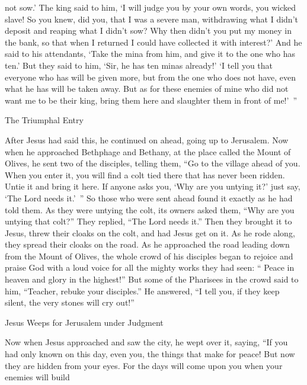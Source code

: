 {not
sow.’
The king said
to him,
‘I will judge
you
by
your own
words,
you wicked
slave! So you knew,
did you, that
I
was
a severe
man,
withdrawing
what
I
didn’t
deposit
and
reaping
what
I
didn’t
sow?
Why
then didn’t
you put
my
money
in
the bank,
so that when I
returned
I could have collected
it
with
interest?’
And
he said
to his attendants, ‘Take
the mina
from
him,
and
give
it to the one who has
ten.’
But
they said
to him,
‘Sir,
he has
ten
minas already!’
‘I tell
you
that
everyone
who has
will be given
more, but
from
the one who does
not
have,
even
what
he has
will be taken away.
But
as for these
enemies
of mine
who did
not
want
me
to be
their king,
bring
them
here
and
slaughter
them
in front of
me!’ ”
\par }{\SH The Triumphal Entry
\par }{\PP {}After
Jesus had said
this,
he continued on
ahead,
going up
to
Jerusalem.
Now when
he approached
Bethphage
and
Bethany,
at
the place called
the Mount
of Olives,
he sent
two
of the disciples,
telling
them, “Go
to
the village
ahead
of you. When
you enter
it, you will find
a colt
tied
there that
has
never
been ridden.
Untie
it
and bring it here.
If
anyone
asks
you,
‘Why
are you untying
it?’ just
say,
‘The Lord
needs
it.’ ”
So
those who were sent ahead
found
it exactly as
he had told
them.
As
they
were untying
the colt,
its
owners
asked
them, “Why
are you untying
that colt?”
They
replied,
“The Lord
needs
it.”
Then
they brought
it
to
Jesus,
threw
their
cloaks
on
the colt,
and had
Jesus
get on it.
As
he
rode along,
they spread
their
cloaks
on
the road.
As
he
approached
the road leading down
from the Mount
of Olives,
the whole
crowd
of his disciples
began
to rejoice
and praise
God
with a
loud
voice
for
all
the mighty works
they had seen:
“{}
Peace
in
heaven
and
glory
in
the highest!”
But
some
of the Pharisees
in
the crowd
said
to
him,
“Teacher,
rebuke
your
disciples.”
He
answered, “I tell
you,
if
they
keep silent,
the very stones
will cry out!”
\par }{\SH Jesus Weeps for Jerusalem under Judgment
\par }{\PP {}Now
when
Jesus approached
and saw
the city,
he wept
over
it,
saying,
“If
you had only known
on
this
day,
even
you,
the things that make for
peace!
 But
now
they are hidden
from
your
eyes.
For
the days
will come
upon
you
when your
enemies
will build
}
